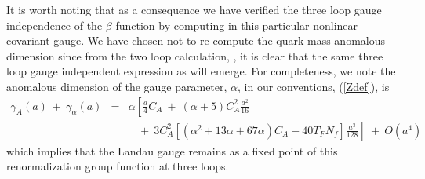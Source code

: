 \documentclass[a4paper,11pt]{article}
\newcommand{\Nf}{N_{\!f}}
\begin{document}
It is worth noting that as a consequence we have verified the three loop gauge 
independence of the $\beta$-function by computing in this particular nonlinear 
covariant gauge. We have chosen not to re-compute the quark mass anomalous 
dimension since from the two loop calculation, \cite{29}, it is clear that the 
same three loop gauge independent expression as \cite{30,31} will emerge. For 
completeness, we note the anomalous dimension of the gauge parameter, $\alpha$,
in our conventions, (\ref{Zdef}), is  
\begin{eqnarray} 
\gamma_A(a) ~+~ \gamma_\alpha(a) &=& \alpha \left[ \frac{a}{4} C_A ~+~ 
\left( \alpha + 5 \right) C_A^2 \frac{a^2}{16} \right. \nonumber \\
&& \left. ~~~~+~ 3 C_A^2 \left[ \left( \alpha^2 + 13\alpha + 67\alpha \right) 
C_A - 40 T_F \Nf \right] \frac{a^3}{128} \right] ~+~ O(a^4) 
\end{eqnarray} 
which implies that the Landau gauge remains as a fixed point of this 
renormalization group function at three loops. 
\end{document}
